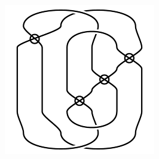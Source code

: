 \begin{figure}[H]
\begin{minipage}[b]{.18\linewidth}
\end{minipage}
\begin{minipage}[b]{.18\linewidth}
\centering
\includegraphics[width=\linewidth]{../data/virtual_4_106.png}
\end{minipage}
\end{figure}

